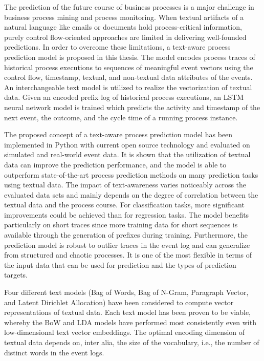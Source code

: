 The prediction of the future course of business processes is a major challenge in business process mining and process monitoring.
When textual artifacts of a natural language like emails or documents hold process-critical information, purely control flow-oriented approaches are limited in delivering well-founded predictions.
In order to overcome these limitations, a text-aware process prediction model is proposed in this thesis.
The model encodes process traces of historical process executions to sequences of meaningful event vectors using the control flow, timestamp, textual, and non-textual data attributes of the events.
An interchangeable text model is utilized to realize the vectorization of textual data.
Given an encoded prefix log of historical process executions, an LSTM neural network model is trained which predicts the activity and timestamp of the next event, the outcome, and the cycle time of a running process instance.

The proposed concept of a text-aware process prediction model has been implemented in Python with current open source technology and evaluated on simulated and real-world event data.
It is shown that the utilization of textual data can improve the prediction performance, and the model is able to outperform state-of-the-art process prediction methods on many prediction tasks using textual data.
The impact of text-awareness varies noticeably across the evaluated data sets and mainly depends on the degree of correlation between the textual data and the process course.
For classification tasks, more significant improvements could be achieved than for regression tasks.
The model benefits particularly on short traces since more training data for short sequences is available through the generation of prefixes during training.
Furthermore, the prediction model is robust to outlier traces in the event log and can generalize from structured and chaotic processes.
It is one of the most flexible in terms of the input data that can be used for prediction and the types of prediction targets.

Four different text models (Bag of Words, Bag of N-Gram, Paragraph Vector, and Latent Dirichlet Allocation) have been considered to compute vector representations of textual data.
Each text model has been proven to be viable, whereby the BoW and LDA models have performed most consistently even with low-dimensional text vector embeddings.
The optimal encoding dimension of textual data depends on, inter alia, the size of the vocabulary, i.e., the number of distinct words in the event logs.

